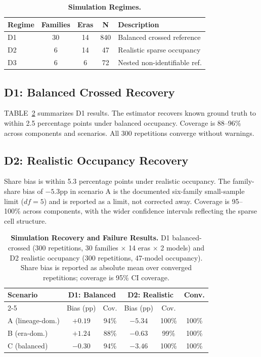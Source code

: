 \documentclass{ieeeaccess}
\theoremstyle{definition}
\theoremstyle{plain}
\begin{document}
\begin{table}[!t]
\caption{\textbf{Simulation Regimes.}}
\label{tab:sim_design}
\centering
\begin{tabular}{l c c c l}
\hline
\textbf{Regime} & \textbf{Families} & \textbf{Eras} & \textbf{N} & \textbf{Description} \\
\hline
D1 & 30 & 14 & 840 & Balanced crossed reference \\
\hline
D2 & 6 & 14 & 47 & Realistic sparse occupancy \\
\hline
D3 & 6 & 6 & 72 & Nested non-identifiable ref. \\
\hline
\end{tabular}
\end{table}

\subsection{D1: Balanced Crossed Recovery}
TABLE~\ref{tab:d1} summarizes D1 results. The estimator recovers known ground truth to within 2.5 percentage points under balanced occupancy. Coverage is 88--96\% across components and scenarios. All 300 repetitions converge without warnings.

\subsection{D2: Realistic Occupancy Recovery}
Share bias is within 5.3 percentage points under realistic occupancy. The family-share bias of $-5.3$pp in scenario A is the documented six-family small-sample limit ($df = 5$) and is reported as a limit, not corrected away. Coverage is 95--100\% across components, with the wider confidence intervals reflecting the sparse cell structure.

\begin{table}[!t]
\caption{\textbf{Simulation Recovery and Failure Results.} D1 balanced-crossed (300 repetitions, 30 families $\times$ 14 eras $\times$ 2 models) and D2 realistic occupancy (300 repetitions, 47-model occupancy). Share bias is reported as absolute mean over converged repetitions; coverage is 95\% CI coverage.}
\label{tab:d1}
\centering
\begin{tabular}{l cc cc c}
\hline
\textbf{Scenario} & \multicolumn{2}{c}{\textbf{D1: Balanced}} & \multicolumn{2}{c}{\textbf{D2: Realistic}} & \textbf{Conv.} \\
\cline{2-5}
 & Bias (pp) & Cov. & Bias (pp) & Cov. & \\
\hline
A (lineage-dom.) & $+0.19$ & 94\% & $-5.34$ & 100\% & 100\% \\
\hline
B (era-dom.) & $+1.24$ & 88\% & $-0.63$ & 99\% & 100\% \\
\hline
C (balanced) & $-0.30$ & 94\% & $-3.46$ & 100\% & 100\% \\
\hline
\end{tabular}
\end{table}
\end{document}
